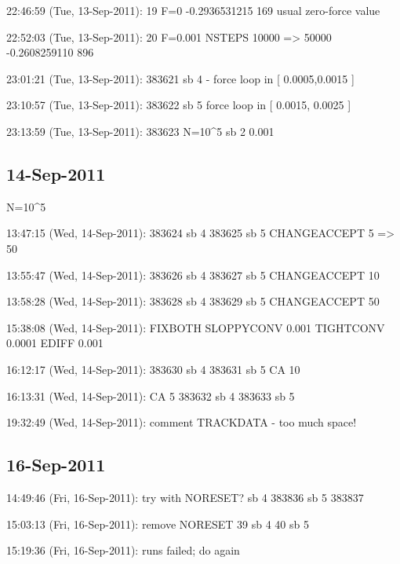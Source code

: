 22:46:59 (Tue, 13-Sep-2011):
19 F=0
-0.2936531215 169  usual zero-force value 


22:52:03 (Tue, 13-Sep-2011):
	20
	F=0.001
	NSTEPS 10000 => 50000
-0.2608259110 896

23:01:21 (Tue, 13-Sep-2011):
	383621 sb 4 - force loop in [ 0.0005,0.0015 ]


23:10:57 (Tue, 13-Sep-2011):
	383622 sb 5 force loop in [ 0.0015, 0.0025 ] 


23:13:59 (Tue, 13-Sep-2011):
	383623
	N=10^5 sb 2 0.001


\subsection{14-Sep-2011}

N=10^5

13:47:15 (Wed, 14-Sep-2011):
383624 sb 4 
383625 sb 5 
CHANGEACCEPT 5 => 50

13:55:47 (Wed, 14-Sep-2011):
383626 sb 4
383627 sb 5
CHANGEACCEPT 10

13:58:28 (Wed, 14-Sep-2011):
383628 sb 4
383629 sb 5
CHANGEACCEPT 50


15:38:08 (Wed, 14-Sep-2011):
FIXBOTH
SLOPPYCONV 0.001
TIGHTCONV  0.0001
EDIFF 0.001


16:12:17 (Wed, 14-Sep-2011):
383630 sb 4
383631 sb 5
CA 10


16:13:31 (Wed, 14-Sep-2011):
CA 5
383632 sb 4
383633 sb 5

19:32:49 (Wed, 14-Sep-2011):
comment TRACKDATA - too much space!
\subsection{16-Sep-2011}

14:49:46 (Fri, 16-Sep-2011):
	try with NORESET?
	sb 4 383836
	sb 5 383837

15:03:13 (Fri, 16-Sep-2011):
	remove NORESET
	39 sb 4
	40 sb 5

15:19:36 (Fri, 16-Sep-2011):
runs failed; do again

